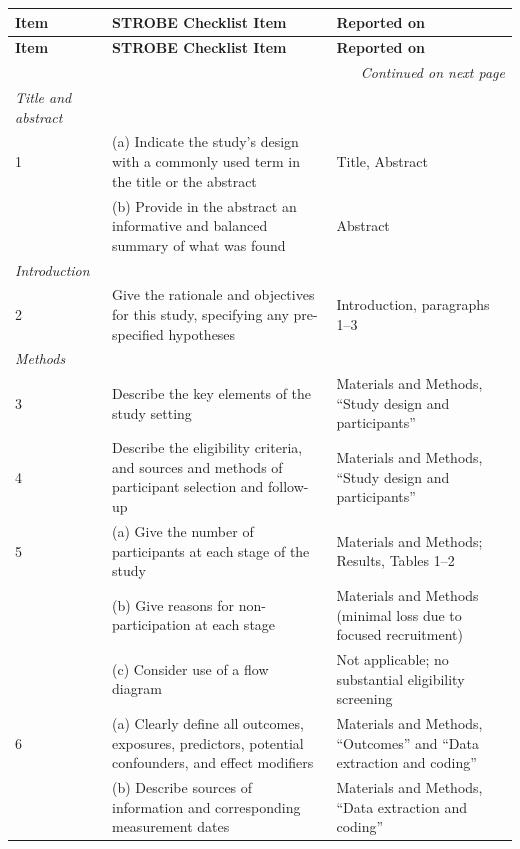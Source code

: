 \documentclass{article}
\begin{document}
\begin{singlespace}
\small
\begin{longtable}{p{}p{}p{}}
\toprule
\textbf{Item} & \textbf{STROBE Checklist Item} & \textbf{Reported on} \\
\midrule
\endfirsthead
\toprule
\textbf{Item} & \textbf{STROBE Checklist Item} & \textbf{Reported on} \\
\midrule
\endhead
\midrule
\multicolumn{3}{r}{\textit{Continued on next page}} \\
\endfoot
\bottomrule
\endlastfoot

\textit{Title and abstract} & & \\
\midrule

1 & (a) Indicate the study's design with a commonly used term in the title or the abstract & Title, Abstract \\
  & (b) Provide in the abstract an informative and balanced summary of what was found & Abstract \\

\midrule
\textit{Introduction} & & \\
\midrule

2 & Give the rationale and objectives for this study, specifying any pre-specified hypotheses & Introduction, paragraphs 1--3 \\

\midrule
\textit{Methods} & & \\
\midrule

3 & Describe the key elements of the study setting & Materials and Methods, ``Study design and participants'' \\

4 & Describe the eligibility criteria, and sources and methods of participant selection and follow-up & Materials and Methods, ``Study design and participants'' \\

5 & (a) Give the number of participants at each stage of the study & Materials and Methods; Results, Tables 1--2 \\
  & (b) Give reasons for non-participation at each stage & Materials and Methods (minimal loss due to focused recruitment) \\
  & (c) Consider use of a flow diagram & Not applicable; no substantial eligibility screening \\

6 & (a) Clearly define all outcomes, exposures, predictors, potential confounders, and effect modifiers & Materials and Methods, ``Outcomes'' and ``Data extraction and coding'' \\
  & (b) Describe sources of information and corresponding measurement dates & Materials and Methods, ``Data extraction and coding'' \\


\end{longtable}
\end{singlespace}
\end{document}
